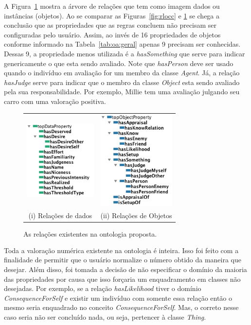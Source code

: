 A Figura~\ref{fig:kplocc} mostra a árvore de relações que tem como imagem
dados ou instâncias (objetos). Ao se comparar as Figuras~\ref{fig:rlocc}
e \ref{fig:kplocc} se chega a conclusão que as propriedades que as
regras concluem não precisam ser configuradas pelo usuário. Assim, ao invés de
16 propriedades de objetos conforme informado na Tabela~\ref{tab:oa:geral}
apenas 9 precisam ser conhecidas. Dessas 9, a propriedade menos utilizada é a
\emph{hasSomething} que serve para indicar genericamente o que esta sendo avaliado. Note que
\emph{hasPerson} deve ser usado quando o indivíduo em avaliação for um membro
da classe \emph{Agent}. Já, a relação \emph{hasJudge} serve para indicar que o
membro da classe \emph{Object} esta sendo avaliado pela sua responsabilidade.
Por exemplo, Millie tem uma avaliação julgando seu carro com uma valoração
positiva.

\begin{figure}[b]
  \centering
  \begin{tabular}{cc}
  \includegraphics[height=4cm]{figuras/dataProperty-LOCC.png} & \includegraphics[height=5cm]{figuras/objectProperty-LOCC.png} \\
  (i) Relações de dados & (ii) Relações de Objetos
  \end{tabular}
  \caption{As relações existentes na ontologia proposta.}
  \label{fig:kplocc}
\end{figure}

Toda a valoração numérica existente na ontologia é inteira. Isso foi feito com a
finalidade de permitir que o usuário normalize\dev{} o número obtido da
maneira que desejar. Além disso, foi tomada a decisão de não especificar o
domínio da maioria das propriedades por causa que isso forçaria um
enquadramento em classes não desejadas. Por exemplo, se a relação
\emph{hasLikelihood} tiver o domínio \emph{ConsequenceForSelf} e existir um
indivíduo com somente essa relação então o mesmo seria enquadrado no conceito
\emph{ConsequenceForSelf}. Mas, o correto nesse caso seria não ser concluído nada,
ou seja, pertencer à classe \emph{Thing}.

